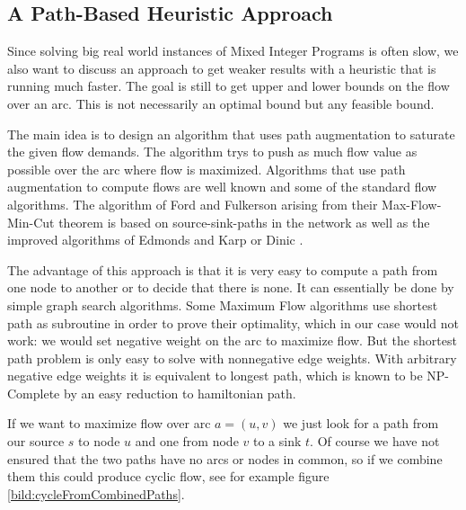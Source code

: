 \newpage
\subsection{A Path-Based Heuristic Approach}
Since solving big real world instances of Mixed Integer Programs is often slow, we also want to discuss an approach 
to get weaker results with a heuristic that is running much faster. The goal is still to get upper and lower bounds 
on the flow over an arc. This is not necessarily an optimal bound but any feasible bound. 

The main idea is to design an algorithm that uses path augmentation to saturate the given flow demands. The 
algorithm trys to push as much flow value as possible over the arc where flow is maximized. Algorithms that use path 
augmentation to compute flows are well known and some of the standard flow algorithms. The algorithm of Ford and 
Fulkerson \cite{Ford-Fulkerson_algo} arising from their Max-Flow-Min-Cut theorem is based on source-sink-paths in the 
network as well as the improved algorithms of Edmonds and Karp \cite{EdmondsKarp1972} or Dinic \cite{Dinic1970}. 

The advantage of this approach is that it is very easy to compute a path from one node to another or to decide that 
there is none. It can essentially be done by simple graph search algorithms. Some Maximum Flow algorithms use shortest 
path as subroutine in order to prove their optimality, which in our case would not work: we would set negative weight 
on the arc to maximize flow. But the shortest path problem is only easy to solve with nonnegative edge weights. With 
arbitrary negative edge weights it is equivalent to longest path, which is 
known to be NP-Complete by an easy reduction to hamiltonian path. \cite{}%

If we want to maximize flow over arc $a=(u,v)$ we just look for a path from our source $s$ to node $u$ and one from node 
$v$ to a sink $t$. Of course we have not ensured that the two paths have no arcs or nodes in common, so if we combine 
them this could produce cyclic flow, see for example figure \ref{bild:cycleFromCombinedPaths}. %

